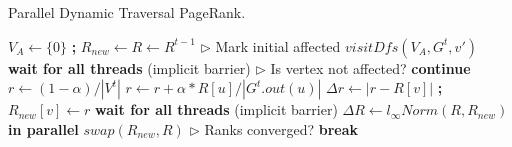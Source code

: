 \begin{algorithm}[!hbt]
\caption{Parallel Dynamic Traversal PageRank.}
\label{alg:prdt}
\begin{algorithmic}[1]

\Statex

  \State $V_A \gets \{0\}$ \textbf{;} $R_{new} \gets R \gets R^{t-1}$
  \State $\rhd$ Mark initial affected
      \State $visitDfs(V_A, G^t, v')$
    \EndFor
  \EndFor
  \State \textbf{wait for all threads} (implicit barrier)
  \ForAll{$i \in [0 .. MAX\_ITERATIONS)$}
      \State $\rhd$ Is vertex not affected?
       \textbf{continue}
      \EndIf
      \State $r \gets (1 - \alpha)/|V^t|$
        \State $r \gets r + \alpha * R[u] / |G^t.out(u)|$
      \EndFor
      \State $\Delta r \gets |r - R[v]|$ \textbf{;} $R_{new}[v] \gets r$
    \EndFor
    \State \textbf{wait for all threads} (implicit barrier)
    \State $\Delta R \gets l_\infty Norm(R, R_{new})$ \textbf{in parallel}
    \State $swap(R_{new}, R)$
    \State $\rhd$ Ranks converged?
     \textbf{break}
    \EndIf
  \EndFor
\EndFunction
\end{algorithmic}
\end{algorithm}





